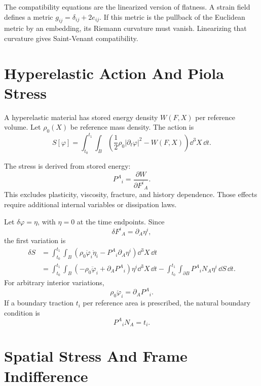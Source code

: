 \begin{remark}
The compatibility equations are the linearized version of flatness. A strain
field defines a metric \(g_{ij}=\delta_{ij}+2e_{ij}\). If this metric is the
pullback of the Euclidean metric by an embedding, its Riemann curvature must
vanish. Linearizing that curvature gives Saint-Venant compatibility.
\end{remark}

\section{Hyperelastic Action And Piola Stress}
\label{sec:hyperelastic-action}

A hyperelastic material has stored energy density \(W(F,X)\) per reference
volume. Let \(\rho_0(X)\) be reference mass density. The action is
\[
  S[\varphi]
  =
  \int_{t_0}^{t_1}\int_B
  \left(
    \frac12\rho_0|\partial_t\varphi|^2-W(F,X)
  \right)\dd^3X\,\dd t.
\]

\begin{assumption}[Hyperelasticity]
The stress is derived from stored energy:
\[
  P^A{}_i=\frac{\partial W}{\partial F^i{}_A}.
\]
This excludes plasticity, viscosity, fracture, and history dependence. Those
effects require additional internal variables or dissipation laws.
\end{assumption}

\begin{derivation}
Let \(\delta\varphi=\eta\), with \(\eta=0\) at the time endpoints. Since
\[
  \delta F^i{}_A=\partial_A\eta^i,
\]
the first variation is
\[
\begin{aligned}
  \delta S
  &=
  \int_{t_0}^{t_1}\int_B
  \left(
    \rho_0\dot\varphi_i\dot\eta_i
    -
    P^A{}_i\partial_A\eta^i
  \right)\dd^3X\,\dd t\\
  &=
  \int_{t_0}^{t_1}\int_B
  \left(
    -\rho_0\ddot\varphi_i
    +
    \partial_A P^A{}_i
  \right)\eta^i\dd^3X\,\dd t
  -
  \int_{t_0}^{t_1}\int_{\partial B}
  P^A{}_iN_A\eta^i\,\dd S\,\dd t.
\end{aligned}
\]
For arbitrary interior variations,
\[
  \boxed{
  \rho_0\ddot\varphi_i=\partial_A P^A{}_i.
  }
\]
If a boundary traction \(t_i\) per reference area is prescribed, the natural
boundary condition is
\[
  P^A{}_iN_A=t_i.
\]
\end{derivation}

\section{Spatial Stress And Frame Indifference}
\label{sec:spatial-stress-frame-indifference}

